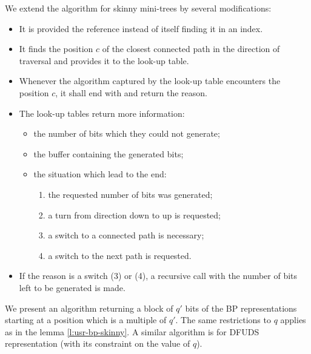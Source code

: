 We extend the algorithm for skinny mini-trees by several modifications:
\begin{itemize}
	\item It is provided the reference instead of itself finding it in an index.
	
	\item It finds the position $c$ of the closest connected path in the direction of traversal and provides it to the look-up table.
	
	\item Whenever the algorithm captured by the look-up table encounters the position $c$, it shall end with and return the reason.
	
	\item The look-up tables return more information:
	\begin{itemize}
		\item the number of bits which they could not generate;
		\item the buffer containing the generated bits;
		\item the situation which lead to the end:
		\begin{enumerate}
			\item the requested number of bits was generated;
			\item a turn from direction down to up is requested;
			\item a switch to a connected path is necessary;
			\item a switch to the next path is requested.
		\end{enumerate}
	\end{itemize}
	
	\item If the reason is a switch (3) or (4), a recursive call with the number of bits left to be generated is made.
\end{itemize}

We present an algorithm returning a block of $q'$ bits of the BP representations starting at a position which is a multiple of $q'$.
The same restrictions to $q$ applies as in the lemma \ref{l:usr-bp-skinny}.
A similar algorithm is for DFUDS representation (with its constraint on the value of $q$).

